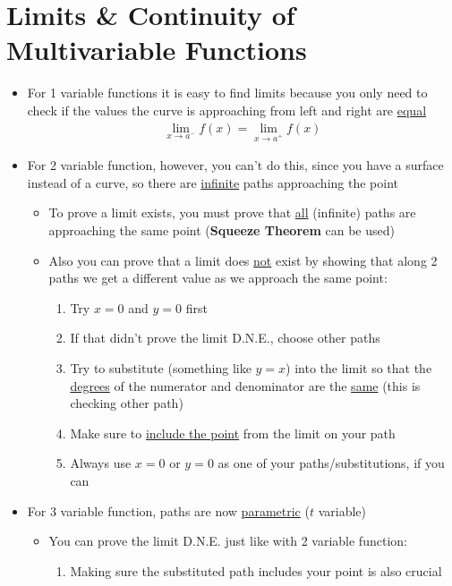 \documentclass{article}
\begin{document}
\section{Limits \& Continuity of Multivariable Functions}
\begin{itemize}
  \item For 1 variable functions it is easy to find limits because you only need to check if the values the curve is approaching from left and right are \underline{equal}
  \begin{align}
    \lim_{x \to a^{-}} f(x) = \lim_{x \to a^{+}} f(x)
  \end{align}
  \item For 2 variable function, however, you can't do this, since you have a surface instead of a curve, so there are \underline{infinite} paths approaching the point
  \begin{itemize}
    \item To prove a limit exists, you must prove that \underline{all} (infinite) paths are approaching the same point (\textbf{Squeeze Theorem} can be used)
    \item Also you can prove that a limit does \underline{not} exist by showing that along 2 paths we get a different value as we approach the same point:
    \begin{enumerate}
      \item Try $x = 0$ and $y = 0$ first
      \item If that didn't prove the limit D.N.E., choose other paths
      \item Try to substitute (something like $y = x$) into the limit so that the \underline{degrees} of the numerator and denominator are the \underline{same} (this is checking other path)
      \item Make sure to \underline{include the point} from the limit on your path
      \item Always use $x = 0$ or $y = 0$ as one of your paths/substitutions, if you can
    \end{enumerate}
  \end{itemize}
  \item For 3 variable function, paths are now \underline{parametric} ($t$ variable)
  \begin{itemize}
    \item You can prove the limit D.N.E. just like with 2 variable function:
    \begin{enumerate}
      \item Making sure the substituted path includes your point is also crucial

\end{enumerate}
\end{itemize}
\end{itemize}
\end{document}
